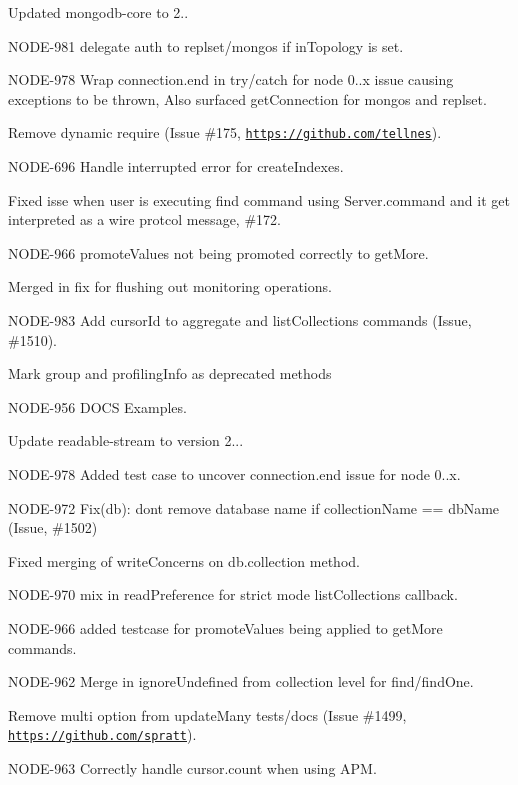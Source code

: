 \begin{DoxyItemize}
\item Updated mongodb-\/core to 2..
\begin{DoxyItemize}
\item N\+O\+D\+E-\/981 delegate auth to replset/mongos if in\+Topology is set.
\item N\+O\+D\+E-\/978 Wrap connection.\+end in try/catch for node 0..\+x issue causing exceptions to be thrown, Also surfaced get\+Connection for mongos and replset.
\item Remove dynamic require (Issue \#175, \href{https://github.com/tellnes}{\tt https\+://github.\+com/tellnes}).
\item N\+O\+D\+E-\/696 Handle interrupted error for create\+Indexes.
\item Fixed isse when user is executing find command using Server.\+command and it get interpreted as a wire protcol message, \#172.
\item N\+O\+D\+E-\/966 promote\+Values not being promoted correctly to get\+More.
\item Merged in fix for flushing out monitoring operations.
\end{DoxyItemize}
\item N\+O\+D\+E-\/983 Add cursor\+Id to aggregate and list\+Collections commands (Issue, \#1510).
\item Mark group and profiling\+Info as deprecated methods
\item N\+O\+D\+E-\/956 D\+O\+CS Examples.
\item Update readable-\/stream to version 2...
\item N\+O\+D\+E-\/978 Added test case to uncover connection.\+end issue for node 0..\+x.
\item N\+O\+D\+E-\/972 Fix(db)\+: don\textquotesingle{}t remove database name if collection\+Name == db\+Name (Issue, \#1502)
\item Fixed merging of write\+Concerns on db.\+collection method.
\item N\+O\+D\+E-\/970 mix in read\+Preference for strict mode list\+Collections callback.
\item N\+O\+D\+E-\/966 added testcase for promote\+Values being applied to get\+More commands.
\item N\+O\+D\+E-\/962 Merge in ignore\+Undefined from collection level for find/find\+One.
\item Remove multi option from update\+Many tests/docs (Issue \#1499, \href{https://github.com/spratt}{\tt https\+://github.\+com/spratt}).
\item N\+O\+D\+E-\/963 Correctly handle cursor.\+count when using A\+PM.
\end{DoxyItemize}

